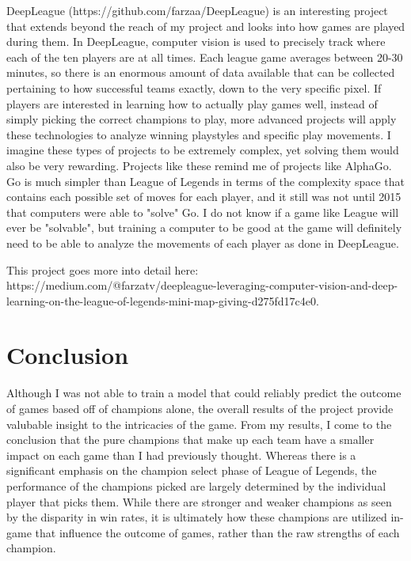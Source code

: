 \documentclass[11pt]{article}
\begin{document}
DeepLeague (https://github.com/farzaa/DeepLeague) is an interesting
project that extends beyond the reach of my project and looks into how
games are played during them. In DeepLeague, computer vision is used to
precisely track where each of the ten players are at all times. Each
league game averages between 20-30 minutes, so there is an enormous
amount of data available that can be collected pertaining to how
successful teams exactly, down to the very specific pixel. If players
are interested in learning how to actually play games well, instead of
simply picking the correct champions to play, more advanced projects
will apply these technologies to analyze winning playstyles and specific
play movements. I imagine these types of projects to be extremely
complex, yet solving them would also be very rewarding. Projects like
these remind me of projects like AlphaGo. Go is much simpler than League
of Legends in terms of the complexity space that contains each possible
set of moves for each player, and it still was not until 2015 that
computers were able to "solve" Go. I do not know if a game like League
will ever be "solvable", but training a computer to be good at the game
will definitely need to be able to analyze the movements of each player
as done in DeepLeague.

This project goes more into detail here:
https://medium.com/@farzatv/deepleague-leveraging-computer-vision-and-deep-learning-on-the-league-of-legends-mini-map-giving-d275fd17c4e0.

    \section{Conclusion}\label{conclusion}

    Although I was not able to train a model that could reliably predict the
outcome of games based off of champions alone, the overall results of
the project provide valubable insight to the intricacies of the game.
From my results, I come to the conclusion that the pure champions that
make up each team have a smaller impact on each game than I had
previously thought. Whereas there is a significant emphasis on the
champion select phase of League of Legends, the performance of the
champions picked are largely determined by the individual player that
picks them. While there are stronger and weaker champions as seen by the
disparity in win rates, it is ultimately how these champions are
utilized in-game that influence the outcome of games, rather than the
raw strengths of each champion.
\end{document}
